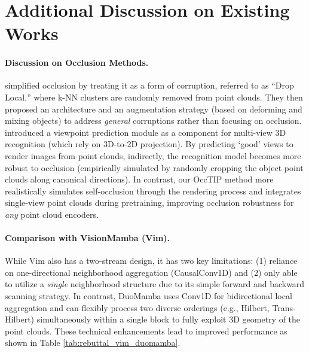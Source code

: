 \clearpage
\setcounter{figure}{4}
\setcounter{table}{5}
\setcounter{section}{7}

\maketitlesupplementary
\section{Additional Discussion on Existing Works}
\paragraph{Discussion on Occlusion Methods.} \citet{modelnetc} simplified occlusion by treating it as a form of corruption, referred to as ``Drop Local,'' where k-NN clusters are randomly removed from point clouds. They then proposed an architecture and an augmentation strategy (based on deforming and mixing objects) to address \textit{general} corruptions rather than focusing on occlusion. \citet{mvtn} introduced a viewpoint prediction module as a component for multi-view 3D recognition (which rely on 3D-to-2D projection). By predicting `good' views to render images from point clouds, indirectly, the recognition model becomes more robust to occlusion (empirically simulated by randomly cropping the object point clouds along canonical directions). In contrast, our OccTIP method more realistically simulates self-occlusion through the rendering process and integrates single-view point clouds during pretraining, improving occlusion robustness for \textit{any} point cloud encoders.

\vspace{-5mm}
\paragraph{Comparison with VisionMamba (Vim).} While Vim \cite{vim} also has a two-stream design, it has two key limitations: (1) reliance on one-directional neighborhood aggregation (CausalConv1D) and (2) only able to utilize a \textit{single} neighborhood structure due to its simple forward and backward scanning strategy. In contrast, DuoMamba uses Conv1D for bidirectional local aggregation and can flexibly process two diverse orderings (e.g., Hilbert, Trans-Hilbert) simultaneously within a single block to fully exploit 3D geometry of the point clouds. These technical enhancements lead to improved performance as shown in Table \ref{tab:rebuttal_vim_duomamba}.
\begin{table}[h!]
\centering
\setlength\aboverulesep{0pt}\setlength\belowrulesep{0pt}
    \setlength{\tabcolsep}{6.5pt}  %
\caption{Zero-shot accuracy of Vim and DuoMamba.}
\label{tab:rebuttal_vim_duomamba}
\end{table}

